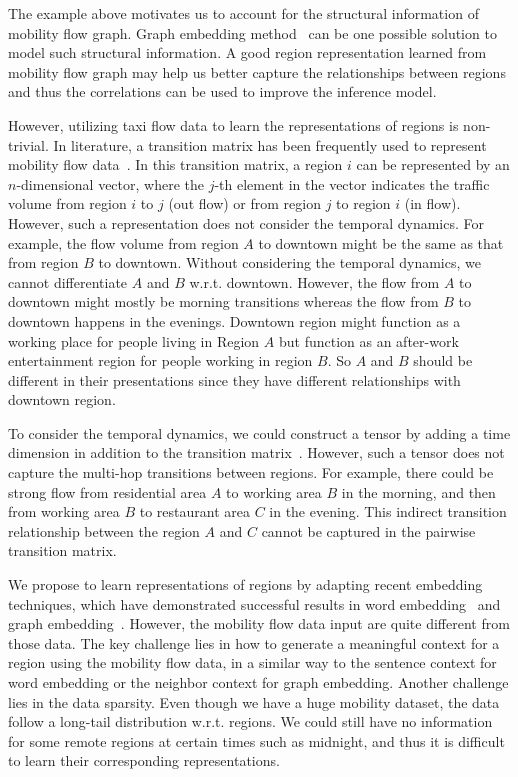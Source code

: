 The example above motivates us to account for the structural information of mobility flow graph. Graph embedding method~\cite{perozzi2014deepwalk,tang2015line} can be one possible solution to model such structural information. A good region representation learned from mobility flow graph may help us better capture the relationships between regions and thus the correlations can be used to improve the inference model.

However, utilizing  taxi flow data to learn the representations of regions is non-trivial. In literature, a transition matrix has been frequently used to represent mobility flow data~\cite{qi2011measuring, pan2013land, zheng2013u, zheng2014diagnosing}.  In this transition matrix, a region $i$ can be represented by an $n$-dimensional vector, where the $j$-th element in the vector indicates the traffic volume from region $i$ to $j$ (out flow) or from region $j$ to region $i$ (in flow). However, such a representation does not consider the temporal dynamics. 
For example, the flow volume from region $A$ to downtown might be the same as that from region $B$ to downtown. Without considering the temporal dynamics, we cannot differentiate $A$ and $B$ w.r.t. downtown. However, the flow from $A$ to downtown might mostly be morning transitions whereas the flow from $B$ to downtown happens in the evenings. Downtown region might function as a working place for people living in Region $A$ but function as an after-work entertainment region for people working in region $B$. 
So $A$ and $B$ should be different in their presentations since they have different relationships with downtown region.


To consider the temporal dynamics, we could  construct a tensor by adding a time dimension in addition to the transition matrix~\cite{yuan2012discovering}.  However, such a tensor does not capture the multi-hop transitions between regions. For example, there could be strong flow from residential area $A$ to working area $B$ in the morning, and then from working area $B$ to restaurant area $C$ in the evening.  This indirect transition relationship between the region $A$ and $C$ cannot be captured in the pairwise transition matrix. 

We propose to learn representations of regions by adapting recent embedding techniques, which have demonstrated successful results in word embedding~\cite{mikolov2013distributed, mikolov2013efficient, mikolov2013linguistic, pennington2014glove} and graph embedding~\cite{perozzi2014deepwalk, tang2015line, grovernode2vec}. However, the mobility flow data input are quite different from those data. The key challenge lies in how to generate a meaningful context for a region using the mobility flow data, in a similar way to the sentence context for word embedding or the neighbor context for graph embedding. Another challenge lies in the data sparsity. Even though we have a huge mobility dataset, the data follow a long-tail distribution w.r.t. regions. We could still have no information for some remote regions at certain times such as midnight, and thus it is difficult to learn their corresponding representations.

